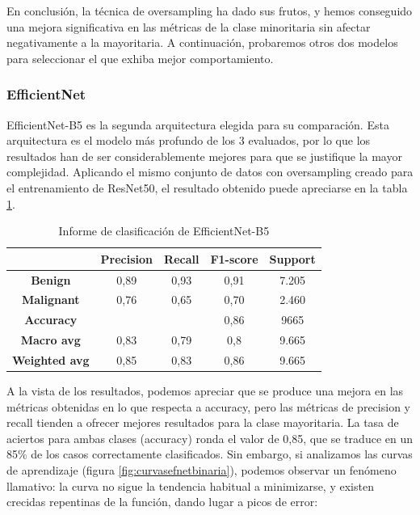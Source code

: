 En conclusión, la técnica de oversampling ha dado sus frutos, y hemos conseguido una mejora significativa en las métricas de la clase minoritaria sin afectar negativamente a la mayoritaria. A continuación, probaremos otros dos modelos para seleccionar el que exhiba mejor comportamiento.

\subsubsection{EfficientNet}

EfficientNet-B5 es la segunda arquitectura elegida para su comparación. Esta arquitectura es el modelo más profundo de los 3 evaluados, por lo que los resultados han de ser considerablemente mejores para que se justifique la mayor complejidad. Aplicando el mismo conjunto de datos con oversampling creado para el entrenamiento de ResNet50, el resultado obtenido puede apreciarse en la tabla \ref{tab:resefnet}.

\begin{table}[H]
	\centering
	\begin{tabular}{|c|c|c|c|c|}
		\hline
		\textbf{} & \textbf{Precision} & \textbf{Recall} & \textbf{F1-score} & \textbf{Support} \\ \hline
		\textbf{Benign} & 0,89 & 0,93 & 0,91 & 7.205 \\ \hline
		\textbf{Malignant} & 0,76 & 0,65 & 0,70 & 2.460 \\ \hline
		\textbf{Accuracy} &  &  & 0,86 & 9665 \\ \hline
		\textbf{Macro avg} & 0,83& 0,79 & 0,8 & 9.665 \\ \hline
		\textbf{Weighted avg} & 0,85 & 0,83 & 0,86 & 9.665 \\ \hline
	\end{tabular}
	\caption{Informe de clasificación de EfficientNet-B5}
	\label{tab:resefnet}
\end{table}

A la vista de los resultados, podemos apreciar que se produce una mejora en las métricas obtenidas en lo que respecta a accuracy, pero las métricas de precision y recall tienden a ofrecer mejores resultados para la clase mayoritaria. La tasa de aciertos para ambas clases (accuracy) ronda el valor de 0,85, que se traduce en un 85\% de los casos correctamente clasificados.  Sin embargo, si analizamos las curvas de aprendizaje (figura \ref{fig:curvasefnetbinaria}), podemos observar un fenómeno llamativo: la curva no sigue la tendencia habitual a minimizarse, y existen crecidas repentinas de la función, dando lugar a picos de error:

